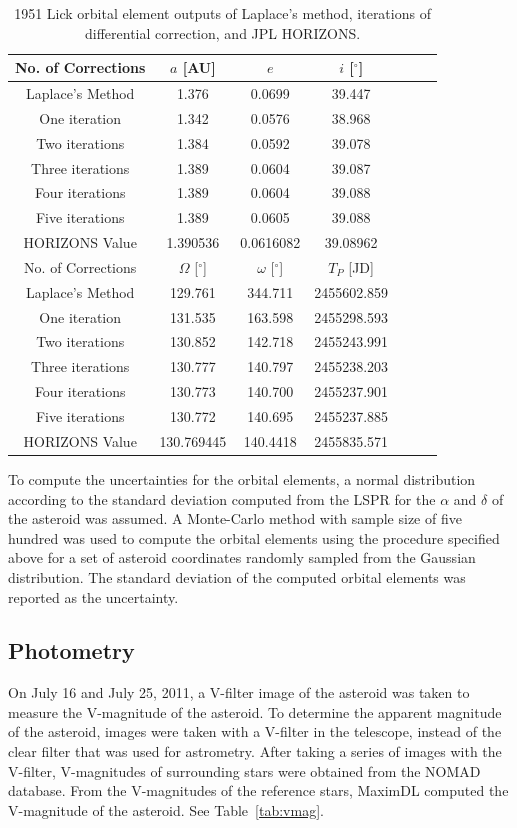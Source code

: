 \documentclass[12pt,journal,compsoc]{IEEEtran}
\begin{document}
\begin{table}[!t]
\centering
\begin{tabular}{|c|c|c|c|c|c|c|}
\hline
No. of Corrections & $a$ [AU]& $e$ & $i$ [$^\circ$] \\ \hline
Laplace's Method &1.376& 0.0699& 39.447 \\ \hline
One iteration &1.342& 0.0576& 38.968 \\ \hline
Two iterations &1.384& 0.0592& 39.078 \\ \hline
Three iterations &1.389& 0.0604& 39.087 \\ \hline
Four iterations &1.389& 0.0604& 39.088 \\ \hline
Five iterations &1.389& 0.0605& 39.088 \\ \hline
HORIZONS Value & 1.390536 & 0.0616082& 39.08962  \\ \hline \hline
No. of Corrections & $\Omega$ [$^\circ$] & $\omega$ [$^\circ$] & $T_P$ [JD]\\ \hline
Laplace's Method & 129.761& 344.711& 2455602.859\\ \hline
One iteration & 131.535& 163.598& 2455298.593\\ \hline
Two iterations & 130.852& 142.718& 2455243.991\\ \hline
Three iterations & 130.777& 140.797& 2455238.203\\ \hline
Four iterations & 130.773& 140.700& 2455237.901\\ \hline
Five iterations & 130.772& 140.695& 2455237.885\\ \hline 
HORIZONS Value & 130.769445 & 140.4418 & 2455835.571 \\ \hline
\end{tabular}
\caption{\label{tab:iterations} 1951 Lick orbital element outputs of Laplace's method, iterations of differential correction, and JPL HORIZONS.}
\end{table}

To compute the uncertainties for the orbital elements, 
a normal distribution according to the standard deviation computed from the LSPR 
for the $\alpha$ and $\delta$ of the asteroid was assumed.
A Monte-Carlo method with sample size of five hundred was used to compute the orbital elements using the procedure 
specified above for a set of asteroid coordinates randomly sampled from the Gaussian distribution.
The standard deviation of the computed orbital elements was reported as the uncertainty.

\subsection{Photometry}
On July 16 and July 25, 2011, a V-filter image of the asteroid was taken to measure the V-magnitude of the asteroid.
To determine the apparent magnitude of the asteroid, images were taken with a V-filter in the telescope, 
instead of the clear filter that was used for astrometry.
After taking a series of images with the V-filter, V-magnitudes of surrounding stars were obtained from the NOMAD database.
From the V-magnitudes of the reference stars, MaximDL computed the V-magnitude of the asteroid. See Table~\ref{tab:vmag}.
\end{document}
